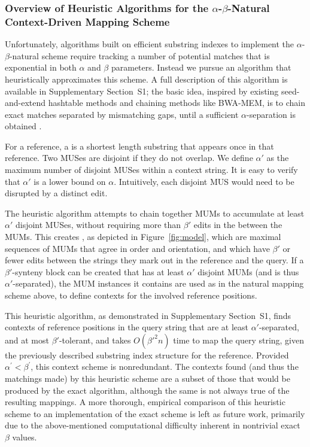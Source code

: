 \subsubsection{Overview of Heuristic Algorithms for the $\alpha$-$\beta$-Natural Context-Driven Mapping Scheme}

Unfortunately, algorithms built on efficient substring indexes to implement the $\alpha$-$\beta$-natural scheme require tracking a number of potential matches that is exponential in both $\alpha$ and $\beta$ parameters. Instead we pursue an algorithm that heuristically approximates this scheme. A full description of this algorithm is available in Supplementary Section~S1; the basic idea, inspired by existing seed-and-extend hashtable methods and chaining methods like BWA-MEM, is to chain exact matches separated by mismatching gaps, until a sufficient $\alpha$-separation is obtained \citep{li2010survey, li2013aligning}.

For a reference, a  is a shortest length substring that appears once in that reference. 
Two MUSes are disjoint if they do not overlap. We define $\alpha'$ as the maximum number of disjoint MUSes within a context string. It is easy to verify that $\alpha'$ is a lower bound on $\alpha$. Intuitively, each disjoint MUS would need to be disrupted by a distinct edit.

The heuristic algorithm attempts to chain together MUMs to accumulate at least $\alpha'$ disjoint MUSes, without requiring more than $\beta'$ edits in the  between the MUMs. This creates , as depicted in Figure~\ref{fig:model}, which are maximal sequences of MUMs that agree in order and orientation, and which have $\beta'$ or fewer edits between the strings they mark out in the reference and the query. If a $\beta'$-synteny block can be created that has at least $\alpha'$ disjoint MUMs (and is thus $\alpha'$-separated), the MUM instances it contains are used as in the natural mapping scheme above, to define contexts for the involved reference positions.

This heuristic algorithm, as demonstrated in Supplementary Section~S1, finds contexts of reference positions in the query string that are at least $\alpha'$-separated, and at most $\beta'$-tolerant, and takes $O(\beta'^2n)$ time to map the query string, given the previously described substring index structure for the reference. Provided $\alpha^\prime < \beta^\prime$, this context scheme is nonredundant. The contexts found (and thus the matchings made) by this heuristic scheme are a subset of those that would be produced by the exact algorithm, although the same is not always true of the resulting mappings. A more thorough, empirical comparison of this heuristic scheme to an implementation of the exact scheme is left as future work, primarily due to the above-mentioned computational difficulty inherent in nontrivial exact $\beta$ values.


